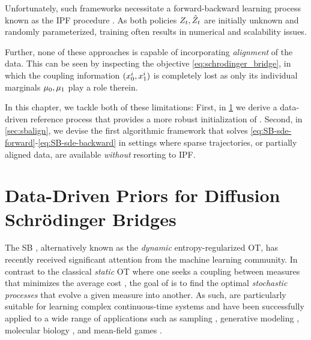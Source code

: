 Unfortunately, such frameworks necessitate a forward-backward learning process known as the \acrfull{IPF} procedure \citep{fortet1940resolution, kullback1968probability}.
As both policies $Z_t, \hat{Z}_t$ are initially unknown and randomly parameterized, training  often results in numerical and scalability issues.

Further, none of these approaches is capable of incorporating \emph{alignment} of the data. This can be seen by inspecting the objective \eqref{eq:schrodinger_bridge}, in which the coupling information $(x_0^i,x_1^i)$ is completely lost as only its individual marginals $\mu_0,\mu_1$ play a role therein.  

In this chapter, we tackle both of these limitations: First, in \cref{sec:gsbflow} we derive a data-driven reference process that provides a more robust initialization of . Second, in \cref{sec:sbalign}, we devise the first algorithmic framework that solves \eqref{eq:SB-sde-forward}-\eqref{eq:SB-sde-backward} in settings where sparse trajectories, or partially aligned data, are available \emph{without} resorting to \acrshort{IPF}.

\section{Data-Driven Priors for Diffusion Schr\"odinger Bridges} \label{sec:gsbflow}

The \acrlong{SB} \citep{leonard2013survey, chen2021stochastic}, alternatively known as the \emph{dynamic} entropy-regularized \acrlong{OT}, has recently received significant attention from the machine learning community. In contrast to the classical \emph{static} \acrshort{OT} where one seeks a coupling between measures that minimizes the average cost \citep{villani2009optimal,peyre2019computational}, the goal of  is to find the optimal \emph{stochastic processes} that evolve a given measure into another. As such,  are particularly suitable for learning complex continuous-time systems and have been successfully applied to a wide range of applications such as sampling \citep{bernton2019schr, huang2021schrodinger}, generative modeling \citep{chen2021likelihood,de2021diffusion,wang2021deep}, molecular biology \citep{holdijk2022path}, and mean-field games \citep{liu2022deep}. 


